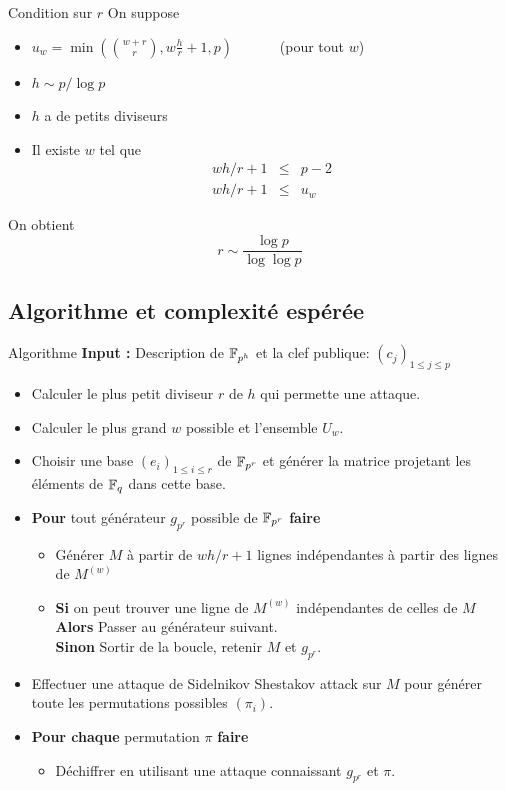 \documentclass[]{beamer}
\begin{document}
\begin{frame}{Condition sur $r$}
On suppose
\begin{itemize}
\item $u_w = \min \left( \binom{w+r}{r}, w\frac{h}{r} + 1 , p \right)$  \ \ \ \ \ \ (pour tout $w$)
\item $h \sim p / \log p$
\item $h$ a de petits diviseurs
\item Il existe $w$ tel que
\begin{eqnarray*}
wh/r+1 &\leq & p-2 \\
wh/r+1 &\leq & u_w 
\end{eqnarray*}
\end{itemize} 
On obtient
$$ r \sim \frac{\log p}{\log \log p} $$
\end{frame}


\subsection{Algorithme et complexité espérée}

\begin{frame}{Algorithme}
\textbf{Input : } Description de $\mathbb{F}_{p^h}$ et la clef publique: $(c_j)_{1 \leq j \leq p}$
\begin{itemize}
\item Calculer le plus petit diviseur $r$ de $h$ qui permette une attaque.

\item Calculer le plus grand $w$ possible et l'ensemble $U_w$.
\item Choisir une base $(e_i)_{1 \leq i \leq r}$ de $\mathbb{F}_{p^r}$ et générer la matrice projetant les éléments de $\mathbb{F}_q$ dans cette base.

\item \textbf{Pour} tout générateur $g_{p^r}$ possible de $\mathbb{F}_{p^r}$ \textbf{faire}
\begin{itemize}
\item Générer $M$ à partir de $wh/r+1$ lignes indépendantes à partir des lignes de $M^{(w)}$

\item \textbf{Si } on peut trouver une ligne de $M^{(w)}$ indépendantes de celles de $M$\\
\textbf{Alors } Passer au générateur suivant. \\
\textbf{Sinon } Sortir de la boucle, retenir $M$ et $g_{p^r}$.
\end{itemize}
\item Effectuer une attaque de Sidelnikov Shestakov attack sur $M$ pour générer toute les permutations possibles $(\pi_i)$.
\item \textbf{Pour chaque } permutation $\pi$ \textbf{ faire }
\begin{itemize}
\item Déchiffrer en utilisant une attaque connaissant $g_{p^r}$ et $\pi$.
\end{itemize}
\end{itemize}
\end{frame}
\end{document}
